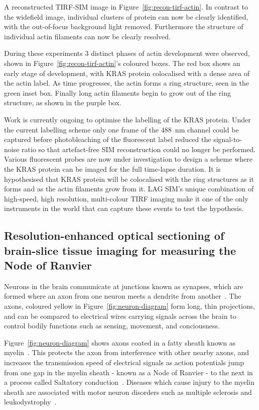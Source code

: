 A reconstructed TIRF-SIM image in Figure~\ref{fig:recon-tirf-actin}. 
In contrast to the widefield image, individual clusters of protein can now be clearly identified, with the out-of-focus background light removed. 
Furthermore the structure of individual actin filaments can now be clearly resolved.

During these experiments 3 distinct phases of actin development were observed, shown in Figure~\ref{fig:recon-tirf-actin}'s coloured boxes.
The red box shows an early stage of development, with KRAS protein colocalised with a dense area of the actin label. 
As time progresses, the actin forms a ring structure, seen in the green inset box. 
Finally long actin filaments begin to grow out of the ring structure, as shown in the purple box.

Work is currently ongoing to optimise the labelling of the KRAS protein.
Under the current labelling scheme only one frame of the \SI{488}{\nano\metre} channel could be captured before photobleaching of the fluorescent label reduced the signal-to-noise ratio so that artefact-free SIM reconstruction could no longer be performed. 
Various fluorescent probes are now under investigation to design a scheme where the KRAS protein can be imaged for the full time-lapse duration. 
It is hypothesised that KRAS protein will be colocalised with the ring structures as it forms and as the actin filaments grow from it.
LAG SIM's unique combination of high-speed, high resolution, multi-colour TIRF imaging make it one of the only instruments in the world that can capture these events to test the hypothesis. 


\subsection{Resolution-enhanced optical sectioning of brain-slice tissue imaging for measuring the Node of Ranvier}
Neurons in the brain communicate at junctions known as synapses, which are formed where an axon from one neuron meets a dendrite from another~\cite{hall1992introduction}. 
The axons, coloured yellow in Figure~\ref{fig:neuron-diagram} form long, thin projections, and can be compared to electrical wires carrying signals across the brain to control bodily functions such as sensing, movement, and conciousness. 

Figure~\ref{fig:neuron-diagram} shows axons coated in a fatty sheath known as myelin~\cite{hall1992introduction}.
This protects the axon from interference with other nearby axons, and increases the transmission speed of electrical signals as action potentials jump from one gap in the myelin sheath - known as a Node of Ranvier - to the next in a process called Saltatory conduction~\cite{tasaki1939electro}.
Diseases which cause injury to the myelin sheath are associated with motor neuron disorders such as multiple sclerosis and leukodystrophy~\cite{suzuki2001demyelinating}. 

